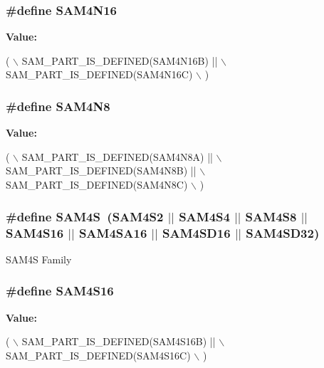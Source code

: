 \subsubsection[{S\+A\+M4\+N16}]{\setlength{\rightskip}{0pt plus 5cm}\#define S\+A\+M4\+N16}\label{group__sam__part__macros__group_gad92bacc1b6c870d806f48e8195527911}
{\bfseries Value\+:}
\begin{DoxyCode}
( \(\backslash\)
        SAM\_PART\_IS\_DEFINED(SAM4N16B) || \(\backslash\)
        SAM\_PART\_IS\_DEFINED(SAM4N16C) \(\backslash\)
        )
\end{DoxyCode}
\hypertarget{group__sam__part__macros__group_ga820cb6819d43d98db4ea8ee4d40adb8a}{}
\subsubsection[{S\+A\+M4\+N8}]{\setlength{\rightskip}{0pt plus 5cm}\#define S\+A\+M4\+N8}\label{group__sam__part__macros__group_ga820cb6819d43d98db4ea8ee4d40adb8a}
{\bfseries Value\+:}
\begin{DoxyCode}
( \(\backslash\)
        SAM\_PART\_IS\_DEFINED(SAM4N8A) || \(\backslash\)
        SAM\_PART\_IS\_DEFINED(SAM4N8B) || \(\backslash\)
        SAM\_PART\_IS\_DEFINED(SAM4N8C) \(\backslash\)
        )
\end{DoxyCode}
\hypertarget{group__sam__part__macros__group_gac3e6ef71bec5113415a64bb14ce8be24}{}
\subsubsection[{S\+A\+M4\+S}]{\setlength{\rightskip}{0pt plus 5cm}\#define S\+A\+M4\+S~(S\+A\+M4\+S2 $\vert$$\vert$ S\+A\+M4\+S4 $\vert$$\vert$ S\+A\+M4\+S8 $\vert$$\vert$ S\+A\+M4\+S16 $\vert$$\vert$ S\+A\+M4\+S\+A16 $\vert$$\vert$ S\+A\+M4\+S\+D16 $\vert$$\vert$ S\+A\+M4\+S\+D32)}\label{group__sam__part__macros__group_gac3e6ef71bec5113415a64bb14ce8be24}
S\+A\+M4\+S Family \hypertarget{group__sam__part__macros__group_ga1c3c5c80f2c2ca26604ff5d59cb3a0b2}{}
\subsubsection[{S\+A\+M4\+S16}]{\setlength{\rightskip}{0pt plus 5cm}\#define S\+A\+M4\+S16}\label{group__sam__part__macros__group_ga1c3c5c80f2c2ca26604ff5d59cb3a0b2}
{\bfseries Value\+:}
\begin{DoxyCode}
( \(\backslash\)
        SAM\_PART\_IS\_DEFINED(SAM4S16B) || \(\backslash\)
        SAM\_PART\_IS\_DEFINED(SAM4S16C) \(\backslash\)
        )
\end{DoxyCode}
\hypertarget{group__sam__part__macros__group_ga797a42a5eb0d374075a5cbf6b6b5318b}{}
